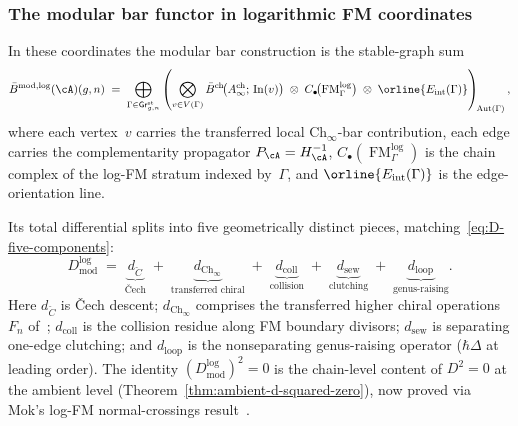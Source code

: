 \subsubsection{The modular bar functor in logarithmic FM coordinates}

\begin{construction}
\label{const:vol1-log-modular-bar-functor}
In these coordinates the modular bar construction is the
stable-graph sum
\begin{equation}\label{eq:bmod-log}
\bar{B}^{\mathrm{mod},\log}(\cA)(g,n)
\;=\;
\bigoplus_{\Gamma \in \mathsf{Gr}^{\mathrm{st}}_{g,n}}
\left(
\bigotimes_{v \in V(\Gamma)}
\bar{B}^{\mathrm{ch}}\!\bigl(A^{\mathrm{ch}}_\infty;\,
\mathrm{In}(v)\bigr)
\;\otimes\;
C_\bullet\!\bigl(\operatorname{FM}^{\log}_\Gamma\bigr)
\;\otimes\;
\orline{E_{\mathrm{int}}(\Gamma)}
\right)_{\!\operatorname{Aut}(\Gamma)},
\end{equation}
where each vertex~$v$ carries the transferred local
$\mathrm{Ch}_\infty$-bar contribution, each edge carries the
complementarity propagator $P_\cA = H_\cA^{-1}$,
$C_\bullet(\operatorname{FM}^{\log}_\Gamma)$ is the chain complex
of the log-FM stratum indexed by~$\Gamma$, and
$\orline{E_{\mathrm{int}}(\Gamma)}$ is the edge-orientation line.

Its total differential splits into five geometrically distinct
pieces, matching~\eqref{eq:D-five-components}:
\begin{equation}\label{eq:dmod-five-log}
D_{\mathrm{mod}}^{\log}
\;=\;
\underbrace{d_{\check{C}}}_{\text{\v{C}ech}}
\;+\;
\underbrace{d_{\mathrm{Ch}_\infty}}_{\text{transferred chiral}}
\;+\;
\underbrace{d_{\mathrm{coll}}}_{\text{collision}}
\;+\;
\underbrace{d_{\mathrm{sew}}}_{\text{clutching}}
\;+\;
\underbrace{d_{\mathrm{loop}}}_{\text{genus-raising}}.
\end{equation}
Here $d_{\check{C}}$ is \v{C}ech descent;
$d_{\mathrm{Ch}_\infty}$ comprises the transferred higher chiral
operations~$F_n$ of~\cite{MS24};
$d_{\mathrm{coll}}$ is the collision residue along FM boundary
divisors;
$d_{\mathrm{sew}}$ is separating one-edge clutching; and
$d_{\mathrm{loop}}$ is the nonseparating genus-raising operator
($\hbar\Delta$ at leading order).
The identity $(D_{\mathrm{mod}}^{\log})^2 = 0$ is the chain-level
content of $D^2 = 0$ at the ambient level
(Theorem~\ref{thm:ambient-d-squared-zero}), now proved via Mok's
log-FM normal-crossings result~\cite[Theorem~3.3.1]{Mok25}.
\end{construction}

